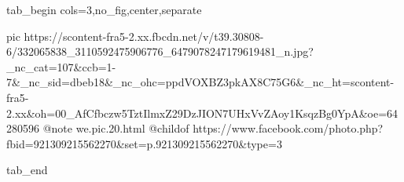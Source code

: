  
 
 
 
 


\ifcmt
  tab_begin cols=3,no_fig,center,separate

     pic https://scontent-fra5-2.xx.fbcdn.net/v/t39.30808-6/332065838_3110592475906776_6479078247179619481_n.jpg?_nc_cat=107&ccb=1-7&_nc_sid=dbeb18&_nc_ohc=ppdVOXBZ3pkAX8C75G6&_nc_ht=scontent-fra5-2.xx&oh=00_AfCfbczw5TztIlmxZ29DzJION7UHxVvZAoy1KsqzBg0YpA&oe=64280596
		 @note we.pic.20.html
		 @childof https://www.facebook.com/photo.php?fbid=921309215562270&set=p.921309215562270&type=3

  tab_end
\fi
